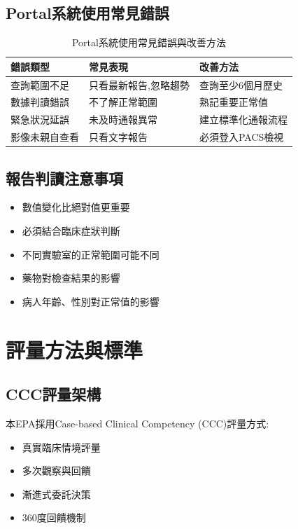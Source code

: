 \documentclass[12pt,a4paper]{article}
\begin{document}
\subsection{Portal系統使用常見錯誤}
\begin{table}[h]
    \centering
    \caption{Portal系統使用常見錯誤與改善方法}
    \begin{tabular}{p{4cm} p{5cm} p{5cm}}
        \toprule
        \textbf{錯誤類型} & \textbf{常見表現} & \textbf{改善方法} \\
        \midrule
        查詢範圍不足 & 只看最新報告,忽略趨勢 & 查詢至少6個月歷史 \\
        數據判讀錯誤 & 不了解正常範圍 & 熟記重要正常值 \\
        緊急狀況延誤 & 未及時通報異常 & 建立標準化通報流程 \\
        影像未親自查看 & 只看文字報告 & 必須登入PACS檢視 \\
        \bottomrule
    \end{tabular}
\end{table}

\subsection{報告判讀注意事項}
\begin{itemize}[nosep]
    \item 數值變化比絕對值更重要
    \item 必須結合臨床症狀判斷
    \item 不同實驗室的正常範圍可能不同
    \item 藥物對檢查結果的影響
    \item 病人年齡、性別對正常值的影響
\end{itemize}

\section{評量方法與標準}

\subsection{CCC評量架構}
本EPA採用Case-based Clinical Competency (CCC)評量方式:
\begin{itemize}[nosep]
    \item 真實臨床情境評量
    \item 多次觀察與回饋
    \item 漸進式委託決策
    \item 360度回饋機制
\end{itemize}
\end{document}
